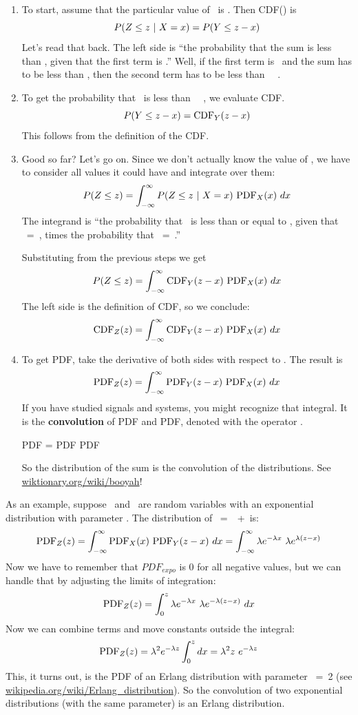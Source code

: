 \documentclass[12pt]{book}
\begin{document}
\begin{enumerate}

\item To start, assume that the particular value
of \X~is \x.  Then CDF(\z) is 
%
\[ P(Z \le z ~|~ X = x)  =  P(Y \le z-x) \]
%
Let's read that back.  
The left side is ``the probability that the sum is less than
\z, given that the first term is \x.''  Well, if
the first term is \x~and the sum has to be less than \z, then the
second term has to be less than \z~\minus~\x.

\item To get the probability that \Y~is less than \z~\minus~\x, we
evaluate CDF.
%
\[ P(Y \le z-x) = \mathrm{CDF}_Y(z-x) \]
%
This follows from the definition of the CDF.

\item Good so far?  Let's go on.  Since we don't actually know
the value of \x, we have to consider all values it could have and
integrate over them:
%
\[ P(Z \le z) = \int_{-\infty}^{\infty} P(Z \le z ~|~ X = x) ~ \mathrm{PDF}_X(x) ~ dx \]
%
The integrand is ``the probability that \Z~is less than or equal
to \z, given that \X~=~\x, times the probability that \X~=~\x.''

Substituting from the previous steps we get
%
\[ P(Z \le z) = \int_{-\infty}^{\infty} \mathrm{CDF}_Y(z-x) ~ \mathrm{PDF}_X(x) ~ dx \]
%
The left side is the definition of CDF, so we conclude:
%
\[ \mathrm{CDF}_Z(z) = \int_{-\infty}^{\infty} \mathrm{CDF}_Y(z-x) ~ \mathrm{PDF}_X(x) ~ dx \]
%

\item To get PDF, take the derivative of
both sides with respect to \z.  The result is
%
\[ \mathrm{PDF}_Z(z) = \int_{-\infty}^{\infty} \mathrm{PDF}_Y(z-x) ~ \mathrm{PDF}_X(x) ~ dx  \]
%
If you have studied signals and systems, you might recognize that
integral.  It is the {\bf convolution} of PDF and PDF, 
denoted with the operator \mystar.

\quad PDF = PDF \mystar PDF

So the distribution of the sum is the convolution of the distributions.
See \url{wiktionary.org/wiki/booyah}!

\end{enumerate}

As an example, suppose \X~and \Y~are random variables with an
exponential distribution with parameter \mylambda.  
The distribution of \Z~=~\X~+~\Y is:
%
\[ \mathrm{PDF}_Z(z) = \int_{-\infty}^{\infty} \mathrm{PDF}_X(x)~\mathrm{PDF}_Y(z-x) ~ dx = 
\int_{-\infty}^{\infty} \lambda e^{-\lambda x}~\lambda e^{\lambda (z-x)} \]
%
Now we have to remember that $PDF_{expo}$ is 0 for all negative
values, but we can handle that by adjusting the limits of integration:
%
\[ \mathrm{PDF}_Z(z) = \int_{0}^{z} \lambda e^{-\lambda x}~\lambda e^{-\lambda (z-x)} ~ dx \]
%
Now we can combine terms and move constants outside the integral:
%
\[ \mathrm{PDF}_Z(z) = \lambda^2 e^{-\lambda z} \int_{0}^{z} dx = 
\lambda^2 z ~ e^{-\lambda z} \]
% 
This, it turns out, is the PDF of an Erlang distribution with
parameter \kk~=~2 (see \url{wikipedia.org/wiki/Erlang_distribution}).
So the convolution of two exponential distributions (with the same
parameter) is an Erlang distribution.
\end{document}
